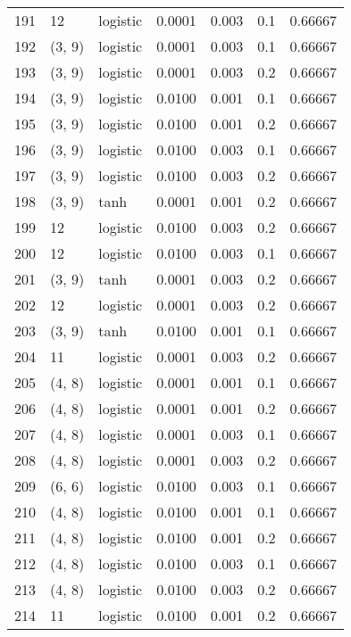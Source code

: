 \begin{tabular}{lllrrrr}
191 &          12 &  logistic &  0.0001 &  0.003 &  0.1 &   0.66667 \\
192 &      (3, 9) &  logistic &  0.0001 &  0.003 &  0.1 &   0.66667 \\
193 &      (3, 9) &  logistic &  0.0001 &  0.003 &  0.2 &   0.66667 \\
194 &      (3, 9) &  logistic &  0.0100 &  0.001 &  0.1 &   0.66667 \\
195 &      (3, 9) &  logistic &  0.0100 &  0.001 &  0.2 &   0.66667 \\
196 &      (3, 9) &  logistic &  0.0100 &  0.003 &  0.1 &   0.66667 \\
197 &      (3, 9) &  logistic &  0.0100 &  0.003 &  0.2 &   0.66667 \\
198 &      (3, 9) &      tanh &  0.0001 &  0.001 &  0.2 &   0.66667 \\
199 &          12 &  logistic &  0.0100 &  0.003 &  0.2 &   0.66667 \\
200 &          12 &  logistic &  0.0100 &  0.003 &  0.1 &   0.66667 \\
201 &      (3, 9) &      tanh &  0.0001 &  0.003 &  0.2 &   0.66667 \\
202 &          12 &  logistic &  0.0001 &  0.003 &  0.2 &   0.66667 \\
203 &      (3, 9) &      tanh &  0.0100 &  0.001 &  0.1 &   0.66667 \\
204 &          11 &  logistic &  0.0001 &  0.003 &  0.2 &   0.66667 \\
205 &      (4, 8) &  logistic &  0.0001 &  0.001 &  0.1 &   0.66667 \\
206 &      (4, 8) &  logistic &  0.0001 &  0.001 &  0.2 &   0.66667 \\
207 &      (4, 8) &  logistic &  0.0001 &  0.003 &  0.1 &   0.66667 \\
208 &      (4, 8) &  logistic &  0.0001 &  0.003 &  0.2 &   0.66667 \\
209 &      (6, 6) &  logistic &  0.0100 &  0.003 &  0.1 &   0.66667 \\
210 &      (4, 8) &  logistic &  0.0100 &  0.001 &  0.1 &   0.66667 \\
211 &      (4, 8) &  logistic &  0.0100 &  0.001 &  0.2 &   0.66667 \\
212 &      (4, 8) &  logistic &  0.0100 &  0.003 &  0.1 &   0.66667 \\
213 &      (4, 8) &  logistic &  0.0100 &  0.003 &  0.2 &   0.66667 \\
214 &          11 &  logistic &  0.0100 &  0.001 &  0.2 &   0.66667 \\

\end{tabular}
